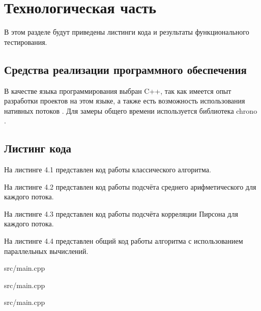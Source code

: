 \chapter{Технологическая часть}
В этом разделе будут приведены листинги кода и результаты функционального тестирования.

\section{Средства реализации программного обеспечения}
В качестве языка программирования выбран C++, так как имеется опыт разработки проектов на этом языке, 
а также есть возможность использования нативных потоков \cite{thread}.
Для замеры общего времени используется библиотека chrono \cite{time}.

\section{Листинг кода}
\FloatBarrier
На листинге 4.1 представлен код работы классического алгоритма.

На листинге 4.2 представлен код работы подсчёта среднего арифметического для каждого потока.

На листинге 4.3 представлен код работы подсчёта корреляции Пирсона для каждого потока.

На листинге 4.4 представлен общий код работы алгоритма с использованием параллельных вычислений.

\begin{lstinputlisting}[language=C++, caption=Реализация классического алгоритма, linerange={16-55}, 
	basicstyle=\footnotesize\ttfamily, frame=single,breaklines=true]{src/main.cpp}
\end{lstinputlisting}
\FloatBarrier

\FloatBarrier
\begin{lstinputlisting}[language=C++, caption=Реализация схемы подсчёта среднего арифметического для каждого потока, 
	linerange={64-74}, basicstyle=\footnotesize\ttfamily, frame=single,breaklines=true]{src/main.cpp}
\end{lstinputlisting}
\FloatBarrier

\FloatBarrier
\begin{lstinputlisting}[language=C++, caption=Реализация схемы подсчёта корреляции Пирсона, linerange={90-125}, 
	basicstyle=\footnotesize\ttfamily, frame=single, breaklines=true]{src/main.cpp}
\end{lstinputlisting}
\FloatBarrier

